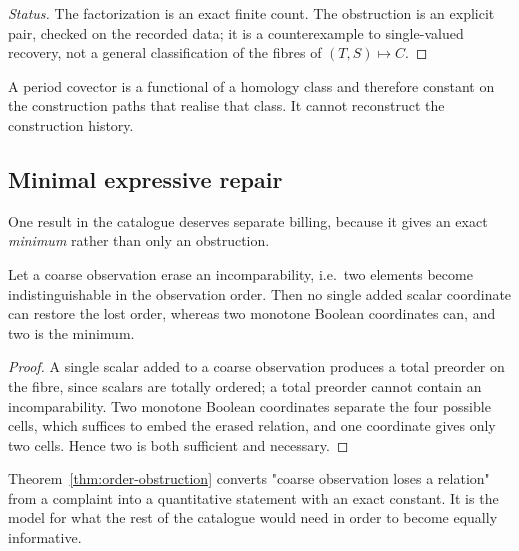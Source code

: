 \begin{proof}[Status]
The factorization is an exact finite count.  The obstruction is an explicit pair, checked
on the recorded data; it is a counterexample to single-valued recovery, not a general
classification of the fibres of $(T,S)\mapsto C$.
\end{proof}

\begin{proposition}\label{prop:period-not-history}
A period covector is a functional of a homology class and therefore constant on the
construction paths that realise that class.  It cannot reconstruct the construction
history.
\end{proposition}

\subsection{Minimal expressive repair}

One result in the catalogue deserves separate billing, because it gives an exact
\emph{minimum} rather than only an obstruction.

\begin{theorem}\label{thm:order-obstruction}
Let a coarse observation erase an incomparability, i.e.\ two elements become
indistinguishable in the observation order.  Then no single added scalar coordinate can
restore the lost order, whereas two monotone Boolean coordinates can, and two is the
minimum.
\end{theorem}

\begin{proof}
A single scalar added to a coarse observation produces a total preorder on the fibre,
since scalars are totally ordered; a total preorder cannot contain an incomparability.  Two
monotone Boolean coordinates separate the four possible cells, which suffices to embed the
erased relation, and one coordinate gives only two cells.  Hence two is both sufficient
and necessary.
\end{proof}

\begin{remark}
Theorem~\ref{thm:order-obstruction} converts "coarse observation loses a relation" from a
complaint into a quantitative statement with an exact constant.  It is the model for what
the rest of the catalogue would need in order to become equally informative.
\end{remark}

